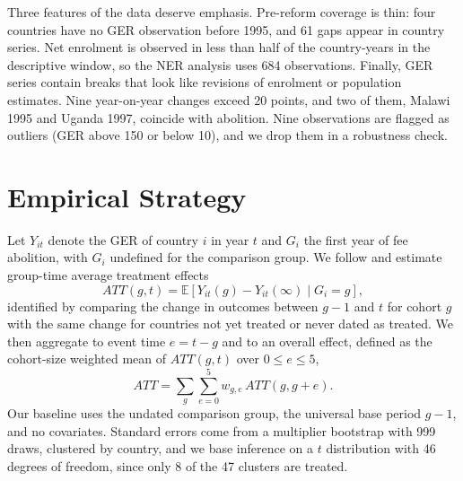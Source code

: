 \documentclass[12pt]{article}
\begin{document}
Three features of the data deserve emphasis. Pre-reform coverage is thin: four countries have no GER observation before 1995, and 61 gaps appear in country series.
Net enrolment is observed in less than half of the country-years in the descriptive window, so the NER analysis uses 684 observations.
Finally, GER series contain breaks that look like revisions of enrolment or population estimates. Nine year-on-year changes exceed 20 points, and two of them, Malawi 1995 and Uganda 1997, coincide with abolition. Nine observations are flagged as outliers (GER above 150 or below 10), and we drop them in a robustness check.

\section{Empirical Strategy}\label{sec:strategy}

Let $Y_{it}$ denote the GER of country $i$ in year $t$ and $G_i$ the first year of fee abolition, with $G_i$ undefined for the comparison group. We follow \citet{callaway2021difference} and estimate group-time average treatment effects
\begin{equation}
ATT(g,t) = \mathbb{E}\left[Y_{it}(g) - Y_{it}(\infty) \mid G_i = g\right],
\label{eq:attgt}
\end{equation}
identified by comparing the change in outcomes between $g-1$ and $t$ for cohort $g$ with the same change for countries not yet treated or never dated as treated. We then aggregate to event time $e = t - g$ and to an overall effect, defined as the cohort-size weighted mean of $ATT(g,t)$ over $0 \le e \le 5$,
\begin{equation}
ATT = \sum_{g}\sum_{e=0}^{5} w_{g,e}\, ATT(g,g+e).
\label{eq:att}
\end{equation}
Our baseline uses the undated comparison group, the universal base period $g-1$, and no covariates. Standard errors come from a multiplier bootstrap with 999 draws, clustered by country, and we base inference on a $t$ distribution with 46 degrees of freedom, since only 8 of the 47 clusters are treated.
\end{document}
